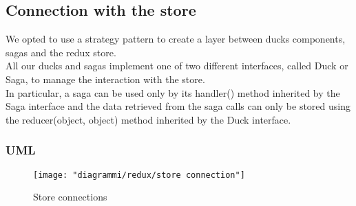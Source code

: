 \documentclass[../redux]{subfiles}
\begin{document}
	\subsection{Connection with the store}
	We opted to use a strategy pattern to create a layer between ducks components, sagas and the redux store.\\
	All our ducks and sagas implement one of two different interfaces, called Duck or Saga, to manage the interaction with the store.\\
	In particular, a saga can be used only by its handler() method inherited by the Saga interface
	and the data retrieved from the saga calls can only be stored using the reducer(object, object) method inherited by the Duck interface.
	\subsubsection{UML}
	\begin{figure}[H]
		\centering
		\texttt{[image: "diagrammi/redux/store connection"]}
		\caption{Store connections}
		\label{fig:Store connections}
	\end{figure}
	
\end{document}
